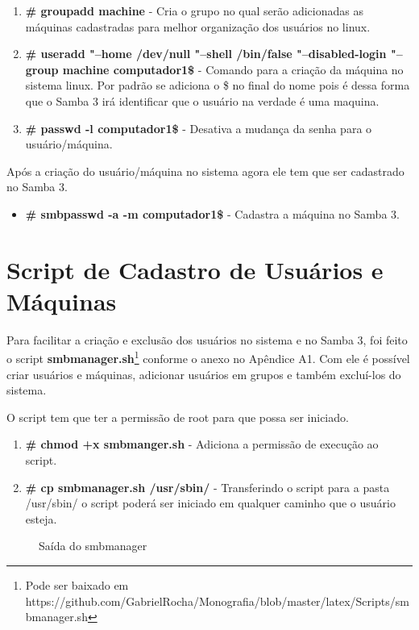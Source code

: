 \begin{enumerate}
	\item \textbf{\# groupadd machine} - Cria o grupo no qual serão adicionadas as máquinas cadastradas para melhor organização dos usuários no linux.
	\item \textbf{\# useradd "--home /dev/null "--shell /bin/false "--disabled-login "--group machine computador1\$} - 	Comando para a criação da máquina no sistema linux. Por padrão se adiciona o \$ no final do nome pois é dessa forma que o Samba 3 irá identificar que o usuário na verdade é uma maquina. 
	\item \textbf{\# passwd -l computador1\$} - Desativa a mudança da senha para o usuário/máquina.
\end{enumerate}

Após a criação do usuário/máquina no sistema agora ele tem que ser cadastrado no Samba 3.

\begin{itemize}	
	\item \textbf{\# smbpasswd -a -m computador1\$} - Cadastra a máquina no Samba 3.
\end{itemize}


\section{Script de Cadastro de Usuários e Máquinas}

Para facilitar a criação e exclusão dos usuários no sistema e no Samba 3, foi feito o script \textbf{smbmanager.sh}\footnote[1]{Pode ser baixado em https://github.com/GabrielRocha/Monografia/blob/master/latex/Scripts/smbmanager.sh} conforme o anexo no Apêndice A1. Com ele é possível criar usuários e máquinas, adicionar usuários em grupos e também excluí-los do sistema.

O script tem que ter a permissão de root para que possa ser iniciado.

\begin{enumerate}
	\item \textbf{\# chmod +x smbmanger.sh} - Adiciona a permissão de execução ao script.
	\item \textbf{\# cp smbmanager.sh /usr/sbin/} - Transferindo o script para a pasta /usr/sbin/ o script poderá ser iniciado em qualquer caminho que o usuário esteja.
\end{enumerate}

\begin{figure}[ht]
   	\centering
   	\caption{Saída do smbmanager}
    \label{smbmanager}
\end{figure}


